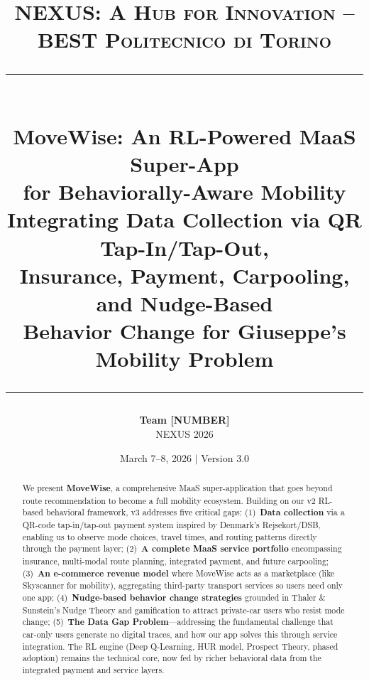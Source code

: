 \documentclass[11pt,a4paper]{article}
\title{
    \vspace{-1cm}
    {\normalsize\textsc{NEXUS: A Hub for Innovation -- BEST Politecnico di Torino}}\\[0.3cm]
    \rule{\textwidth}{1pt}\\[0.5cm]
    {\LARGE\textbf{MoveWise: An RL-Powered MaaS Super-App\\for Behaviorally-Aware Mobility}}\\[0.4cm]
    {\large Integrating Data Collection via QR Tap-In/Tap-Out,\\Insurance, Payment, Carpooling, and Nudge-Based\\Behavior Change for Giuseppe's Mobility Problem}\\[0.5cm]
    \rule{\textwidth}{1pt}
}
\author{
    \textbf{Team [NUMBER]}\\
    \small NEXUS 2026
}
\date{March 7--8, 2026 \quad $\vert$ \quad Version 3.0}
\begin{document}
\maketitle

\begin{abstract}
\noindent
We present \textbf{MoveWise}, a comprehensive MaaS super-application that goes beyond route recommendation to become a full mobility ecosystem. Building on our v2 RL-based behavioral framework, v3 addresses five critical gaps: (1)~\textbf{Data collection} via a QR-code tap-in/tap-out payment system inspired by Denmark's Rejsekort/DSB, enabling us to observe mode choices, travel times, and routing patterns directly through the payment layer; (2)~\textbf{A complete MaaS service portfolio} encompassing insurance, multi-modal route planning, integrated payment, and future carpooling; (3)~\textbf{An e-commerce revenue model} where MoveWise acts as a marketplace (like Skyscanner for mobility), aggregating third-party transport services so users need only one app; (4)~\textbf{Nudge-based behavior change strategies} grounded in Thaler \& Sunstein's Nudge Theory and gamification to attract private-car users who resist mode change; (5)~\textbf{The Data Gap Problem}---addressing the fundamental challenge that car-only users generate no digital traces, and how our app solves this through service integration. The RL engine (Deep Q-Learning, HUR model, Prospect Theory, phased adoption) remains the technical core, now fed by richer behavioral data from the integrated payment and service layers.
\end{abstract}

\end{document}
